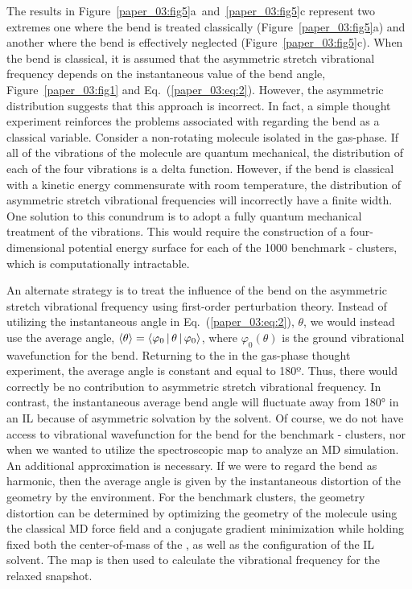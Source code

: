 \documentclass[]{article}
\begin{document}
The results in Figure~\ref{paper_03:fig5}a~and~\ref{paper_03:fig5}c represent two extremes \textemdash{} one where the  bend is treated classically (Figure~\ref{paper_03:fig5}a) and another where the  bend is effectively neglected (Figure~\ref{paper_03:fig5}c). When the  bend is classical, it is assumed that the  asymmetric stretch vibrational frequency depends on the instantaneous value of the bend angle, Figure~\ref{paper_03:fig1} and Eq.~(\ref{paper_03:eq:2}). However, the asymmetric distribution suggests that this approach is incorrect. In fact, a simple thought experiment reinforces the problems associated with regarding the  bend as a classical variable. Consider a non-rotating  molecule isolated in the gas-phase. If all of the vibrations of the  molecule are quantum mechanical, the distribution of each of the four vibrations is a delta function. However, if the bend is classical with a kinetic energy commensurate with room temperature, the distribution of asymmetric stretch vibrational frequencies will incorrectly have a finite width. One solution to this conundrum is to adopt a fully quantum mechanical treatment of the  vibrations. This would require the construction of a four-dimensional potential energy surface for each of the 1000 benchmark -\ce{[C4C1im][PF6]} clusters, which is computationally intractable.

An alternate strategy is to treat the influence of the  bend on the asymmetric stretch vibrational frequency using first-order perturbation theory. Instead of utilizing the instantaneous  angle in Eq.~(\ref{paper_03:eq:2}), \(\theta\), we would instead use the average angle, \(\Braket{\theta} = \Braket{ \varphi_{0} | \theta | \varphi_{0} }\), where \(\varphi_{0}(\theta)\) is the ground vibrational wavefunction for the  bend. Returning to the  in the gas-phase thought experiment, the average angle is constant and equal to 180º. Thus, there would correctly be no contribution to  asymmetric stretch vibrational frequency. In contrast, the instantaneous average bend angle will fluctuate away from \ang{180} in an IL because of asymmetric solvation by the solvent. Of course, we do not have access to vibrational wavefunction for the  bend for the benchmark -\ce{[C4C1im][PF6]} clusters, nor when we wanted to utilize the spectroscopic map to analyze an MD simulation. An additional approximation is necessary. If we were to regard the  bend as harmonic, then the average angle is given by the instantaneous distortion of the  geometry by the environment. For the benchmark clusters, the geometry distortion can be determined by optimizing the geometry of the  molecule using the classical MD force field and a conjugate gradient minimization while holding fixed both the center-of-mass of the , as well as the configuration of the IL solvent. The map is then used to calculate the vibrational frequency for the relaxed snapshot.
\end{document}

